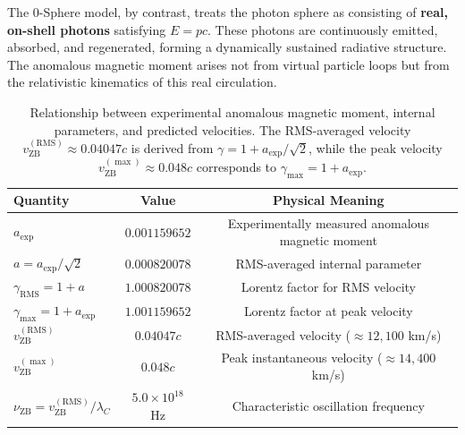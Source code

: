 \documentclass[12pt,letterpaper]{article}
\begin{document}
The 0-Sphere model, by contrast, treats the photon sphere as consisting of \textbf{real, on-shell photons} satisfying $E = pc$. These photons are continuously emitted, absorbed, and regenerated, forming a dynamically sustained radiative structure. The anomalous magnetic moment arises not from virtual particle loops but from the relativistic kinematics of this real circulation.

\begin{table}[t!]
\centering
\renewcommand{\arraystretch}{1.3}
\begin{tabular}{lcc}
\toprule
\textbf{Quantity} & \textbf{Value} & \textbf{Physical Meaning} \\
\midrule
$a_{\mathrm{exp}}$ 
& $0.001159652$ 
& Experimentally measured anomalous magnetic moment \\
\addlinespace[0.1cm]
$a = a_{\mathrm{exp}}/\sqrt{2}$ 
& $0.000820078$ 
& RMS-averaged internal parameter \\
\addlinespace[0.1cm]
$\gamma_{\mathrm{RMS}} = 1 + a$ 
& $1.000820078$ 
& Lorentz factor for RMS velocity \\
\addlinespace[0.1cm]
$\gamma_{\max} = 1 + a_{\mathrm{exp}}$ 
& $1.001159652$ 
& Lorentz factor at peak velocity \\
\addlinespace[0.1cm]
$v_{\mathrm{ZB}}^{(\mathrm{RMS})}$ 
& $0.04047c$ 
& RMS-averaged velocity ($\approx 12{,}100$ km/s) \\
\addlinespace[0.1cm]
$v_{\mathrm{ZB}}^{(\max)}$ 
& $0.048c$ 
& Peak instantaneous velocity ($\approx 14{,}400$ km/s) \\
\addlinespace[0.1cm]
$\nu_{\mathrm{ZB}} = v_{\mathrm{ZB}}^{(\mathrm{RMS})}/\lambda_C$ 
& $5.0 \times 10^{18}$ Hz 
& Characteristic oscillation frequency \\
\bottomrule
\end{tabular}
\caption{Relationship between experimental anomalous magnetic moment, internal parameters, and predicted velocities. The RMS-averaged velocity $v_{\mathrm{ZB}}^{(\mathrm{RMS})} \approx 0.04047c$ is derived from $\gamma = 1 + a_{\mathrm{exp}}/\sqrt{2}$, while the peak velocity $v_{\mathrm{ZB}}^{(\max)} \approx 0.048c$ corresponds to $\gamma_{\max} = 1 + a_{\mathrm{exp}}$.}
\label{tab:velocity_hierarchy}
\end{table}
\end{document}
